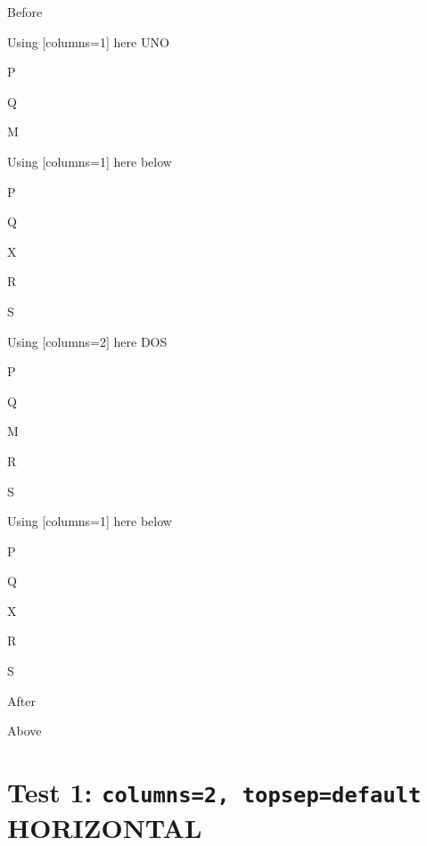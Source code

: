 \documentclass[10pt]{article}
\begin{document}
Before
\begin{enumext}[columns=2,nosep]%

\item Using [columns=1] here UNO

  \begin{enumext}[columns=1,nosep]%
     \item  P \item Q \item M %
  \end{enumext}

\item Using [columns=1] here below
\begin{enumext}[columns=1]%
     \item  P \item Q \item X  \item R \item S
  \end{enumext}

\columnbreak

\item Using [columns=2] here DOS

  \begin{enumext}[columns=2,nosep]%
    \item  P \item Q \item M \item R \item S
  \end{enumext}

\item Using [columns=1] here below
\begin{enumext}[columns=1]%
     \item  P \item Q \item X  \item R \item S
  \end{enumext}

\end{enumext}
After


Above

\newpage

\section{Test 1: \texttt{columns=2, topsep=default} HORIZONTAL}
\end{document}
